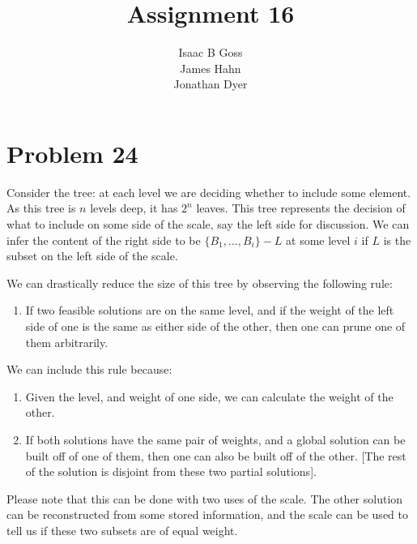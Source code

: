 \documentclass{article}
\author{Isaac B Goss\\ James Hahn\\ Jonathan Dyer}
\title{Assignment 16}
\providecommand{\prob}[1]{\section*{Problem #1}}
\begin{document}
\maketitle

    \prob{24}
    Consider the tree: at each level we are deciding whether to include some element.
    As this tree is $n$ levels deep, it has $2^n$ leaves.
    This tree represents the decision of what to include on some side of the scale, say the left side for discussion.
    We can infer the content of the right side to be $\{B_1, \dots, B_i\} - L$ at some level $i$ if $L$ is the subset on the left side of the scale.

    We can drastically reduce the size of this tree by observing the following rule:
    \begin{enumerate}
        \item If two feasible solutions are on the same level, 
        and if the weight of the left side of one is the same as either side of the other, 
        then one can prune one of them arbitrarily.
    \end{enumerate}
    We can include this rule because:
    \begin{enumerate}[label=\roman*)]
        \item Given the level, and weight of one side, we can calculate the weight of the other.
        \item If both solutions have the same pair of weights, and a global solution can be built off of one of them,
            then one can also be built off of the other. 
            [The rest of the solution is disjoint from these two partial solutions].
    \end{enumerate}
    Please note that this can be done with two uses of the scale.
    The other solution can be reconstructed from some stored information, 
    and the scale can be used to tell us if these two subsets are of equal weight.
\end{document}
